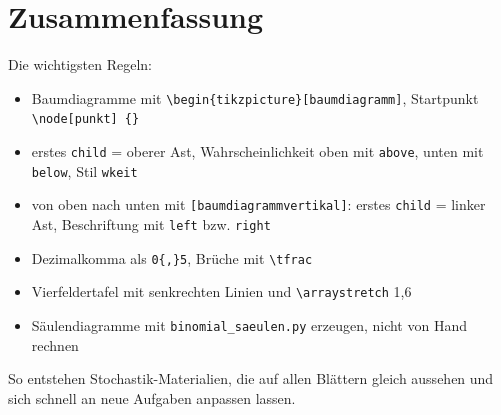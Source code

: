 \section{Zusammenfassung}

Die wichtigsten Regeln:

\begin{itemize}
	\item Baumdiagramme mit \texttt{\textbackslash begin\{tikzpicture\}[baumdiagramm]}, Startpunkt \texttt{\textbackslash node[punkt] \{\}}
	\item erstes \texttt{child} = oberer Ast, Wahrscheinlichkeit oben mit \texttt{above}, unten mit \texttt{below}, Stil \texttt{wkeit}
	\item von oben nach unten mit \texttt{[baumdiagrammvertikal]}: erstes \texttt{child} = linker Ast, Beschriftung mit \texttt{left} bzw. \texttt{right}
	\item Dezimalkomma als \texttt{0\{,\}5}, Brüche mit \texttt{\textbackslash tfrac}
	\item Vierfeldertafel mit senkrechten Linien und \texttt{\textbackslash arraystretch} 1,6
	\item Säulendiagramme mit \texttt{binomial\_saeulen.py} erzeugen, nicht von Hand rechnen
\end{itemize}

So entstehen Stochastik-Materialien, die auf allen Blättern gleich aussehen und sich schnell an neue Aufgaben anpassen lassen.


